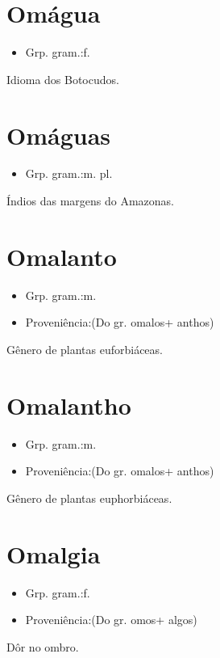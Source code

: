 \section{Omágua}
\begin{itemize}
\item {Grp. gram.:f.}
\end{itemize}
Idioma dos Botocudos.
\section{Omáguas}
\begin{itemize}
\item {Grp. gram.:m. pl.}
\end{itemize}
Índios das margens do Amazonas.
\section{Omalanto}
\begin{itemize}
\item {Grp. gram.:m.}
\end{itemize}
\begin{itemize}
\item {Proveniência:(Do gr. \textunderscore omalos\textunderscore  + \textunderscore anthos\textunderscore )}
\end{itemize}
Gênero de plantas euforbiáceas.
\section{Omalantho}
\begin{itemize}
\item {Grp. gram.:m.}
\end{itemize}
\begin{itemize}
\item {Proveniência:(Do gr. \textunderscore omalos\textunderscore  + \textunderscore anthos\textunderscore )}
\end{itemize}
Gênero de plantas euphorbiáceas.
\section{Omalgia}
\begin{itemize}
\item {Grp. gram.:f.}
\end{itemize}
\begin{itemize}
\item {Proveniência:(Do gr. \textunderscore omos\textunderscore  + \textunderscore algos\textunderscore )}
\end{itemize}
Dôr no ombro.
